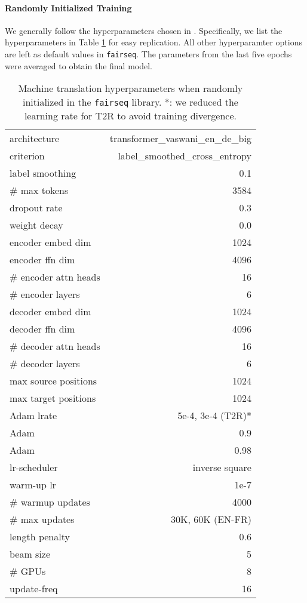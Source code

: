 \documentclass[11pt]{article}
\newcommand{\TRNN}{T2R\xspace}
\begin{document}
\paragraph{Randomly Initialized Training}
We generally follow the hyperparameters chosen in \citet{Vaswani2017AttentionIA, Ott2018ScalingNM}.
Specifically, we list the hyperparameters in Table \ref{tab:mt-hyp} for easy replication. All other hyperparamter options are left as default values in \texttt{fairseq}.
The parameters from the last five epochs were averaged to obtain the final model.


\begin{table}[h]
\small
\centering
\begin{tabular}{ |l r|}
\hline
architecture & transformer\_vaswani\_en\_de\_big\\
criterion & label\_smoothed\_cross\_entropy\\
label smoothing & 0.1\\
\# max tokens & 3584 \\
dropout rate & 0.3\\
weight decay & 0.0 \\
encoder embed dim  & 1024\\
encoder ffn dim  & 4096\\
\# encoder attn heads & 16\\
\# encoder layers & 6 \\
decoder embed dim  & 1024\\
decoder ffn dim  & 4096\\
\# decoder attn heads & 16\\
\# decoder layers & 6 \\
max source positions & 1024 \\
max target positions & 1024 \\
Adam lrate& 5e-4, 3e-4 (\TRNN)*\\
Adam & 0.9\\
Adam & 0.98\\
lr-scheduler &  inverse square \\
warm-up lr & 1e-7 \\
\# warmup updates & 4000 \\
\# max updates &  30K, 60K (EN-FR) \\
length penalty & 0.6\\
beam size & 5\\
\# GPUs & 8 \\
update-freq & 16\\
\hline
\end{tabular}
\caption{Machine translation hyperparameters when randomly initialized in the \texttt{fairseq} library. *: we reduced the learning rate for \TRNN to avoid training divergence.}
\label{tab:mt-hyp}
\end{table}
\end{document}
